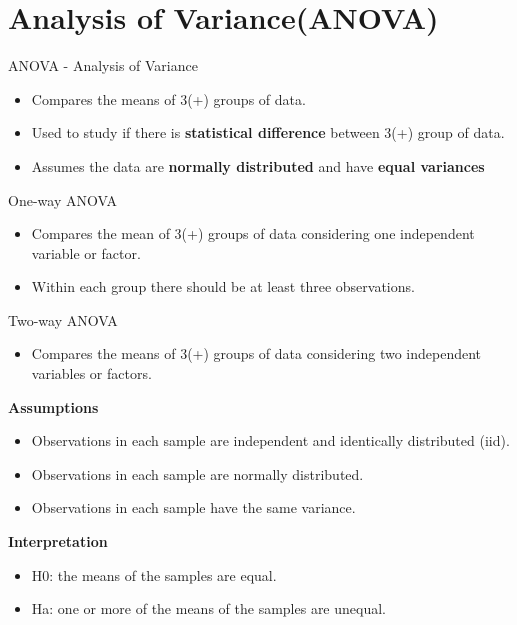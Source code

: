 \section{Analysis of Variance(ANOVA)}
\begin{frame}[t]{ANOVA - Analysis of Variance}
	\begin{itemize}
		\item Compares the means of 3(+) groups of data.
		\item Used to study if there is \textbf{statistical difference} between 3(+) group of data.
		\item Assumes the data are \textbf{normally distributed} and have \textbf{equal variances}
	\end{itemize}
	
\end{frame}
\begin{frame}[t]{One-way ANOVA}
	\begin{itemize}
		\item Compares the mean of 3(+) groups of data considering one independent variable or factor.
		\item Within each group there should be at least three observations.
	\end{itemize}
\end{frame}
\begin{frame}[t]{Two-way ANOVA}
	\begin{itemize}
		\item Compares the means of 3(+) groups of data considering two independent variables or factors.
	\end{itemize}
	\textbf{Assumptions}\\
	\begin{itemize}
		\item Observations in each sample are independent and identically distributed (iid).
		\item Observations in each sample are normally distributed.
		\item Observations in each sample have the same variance.
	\end{itemize}
	\textbf{Interpretation}\\
	\begin{itemize}
		\item H0: the means of the samples are equal.
		\item Ha: one or more of the means of the samples are unequal.
	\end{itemize}
\end{frame}



